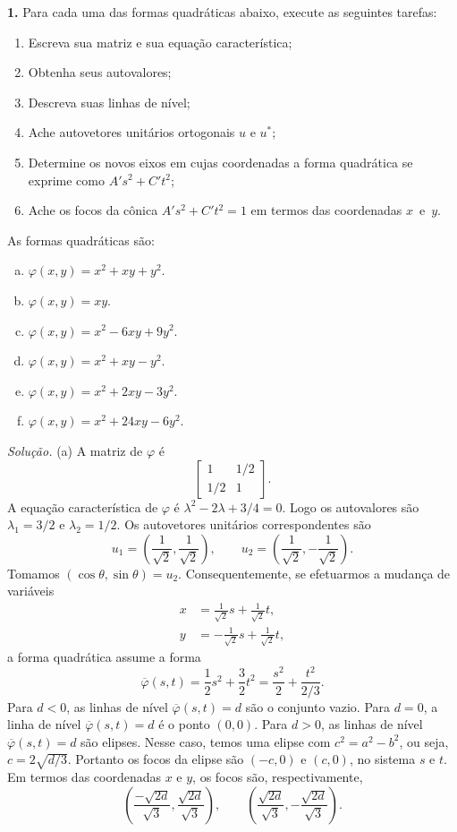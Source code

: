 \documentclass[a4paper,11pt]{article}
\begin{document}
\textbf{1.}
Para cada uma das formas quadráticas abaixo, execute as seguintes tarefas:
\begin{enumerate}
  \item
    Escreva sua matriz e sua equação característica;
  \item
    Obtenha seus autovalores;
  \item
    Descreva suas linhas de nível;
  \item
    Ache autovetores unitários ortogonais $u$ e $u^*$;
  \item
    Determine os novos eixos em cujas coordenadas a forma quadrática se exprime como $A' s^2 + C' t^2$;
  \item
    Ache os focos da cônica $A' s^2 + C' t^2 = 1$ em termos das coordenadas $x$~e~$y$.
\end{enumerate}
As formas quadráticas são:
\begin{enumerate}[(a)]
  \item
    $\varphi(x,y) = x^2 + xy + y^2$.
  \item
    $\varphi(x,y) = xy$.
  \item
    $\varphi(x,y) = x^2 -6 xy +9 y^2$.
  \item
    $\varphi(x,y) = x^2 + xy - y^2$.
  \item
    $\varphi(x,y) = x^2 +2 xy -3 y^2$.
  \item
    $\varphi(x,y) = x^2 +24 xy -6 y^2$.
\end{enumerate}

\vspace{\baselineskip}

\emph{Solução.}
(a)
A matriz de $\varphi$ é
\[
  \begin{bmatrix}
    1 & 1/2 \\
    1/2 & 1
  \end{bmatrix}.
\]
A equação característica de $\varphi$ é $\lambda^2 - 2\lambda + 3/4 = 0$.
Logo os autovalores são $\lambda_1 = 3/2$ e $\lambda_2 = 1/2$.
Os autovetores unitários correspondentes são
\[
  u_1 = \left( \frac{1}{\sqrt{2}}, \frac{1}{\sqrt{2}} \right), \qquad u_2 = \left( \frac{1}{\sqrt{2}}, -\frac{1}{\sqrt{2}} \right).
\]
Tomamos $(\cos \theta, \sin \theta) = u_2$.
Consequentemente, se efetuarmos a mudança de variáveis
\begin{align*}
  x & = \frac{1}{\sqrt{2}} s + \frac{1}{\sqrt{2}} t, \\
  y & = -\frac{1}{\sqrt{2}} s + \frac{1}{\sqrt{2}} t,
\end{align*}
a forma quadrática assume a forma
\[
  \overline{\varphi}(s,t) = \frac{1}{2} s^2 + \frac{3}{2} t^2 = \frac{s^2}{2} + \frac{t^2}{2/3}.
\]
Para $d < 0$, as linhas de nível $\overline{\varphi}(s,t) = d$ são o conjunto vazio.
Para $d = 0$, a linha de nível $\overline{\varphi}(s,t) = d$ é o ponto $(0,0)$.
Para $d > 0$, as linhas de nível $\overline{\varphi}(s,t) = d$ são elipses.
Nesse caso, temos uma elipse com $c^2 = a^2 - b^2$, ou seja, $c = 2 \sqrt{d/3}$.
Portanto os focos da elipse são $(-c,0)$ e $(c,0)$, no sistema $s$ e $t$.
Em termos das coordenadas $x$ e $y$, os focos são, respectivamente,
\[
  \left( \frac{-\sqrt{2d}}{\sqrt{3}}, \frac{\sqrt{2d}}{\sqrt{3}} \right), \qquad \left( \frac{\sqrt{2d}}{\sqrt{3}}, -\frac{\sqrt{2d}}{\sqrt{3}} \right).
\]
\end{document}
